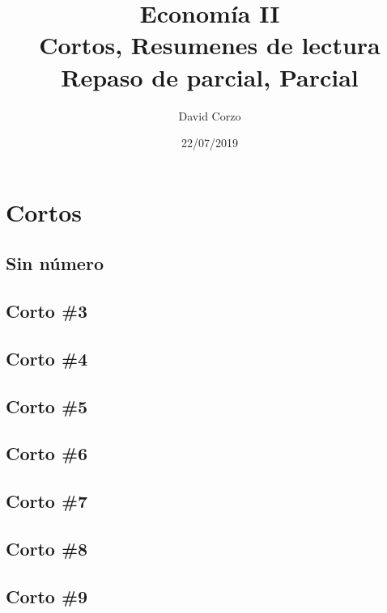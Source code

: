 \documentclass{book}
\author{David Corzo}
\date{22/07/2019}
\title{\Huge Economía II \normalsize \\ Cortos, Resumenes de lectura \\ Repaso de parcial, Parcial }
\begin{document}
\maketitle
\tableofcontents

\part{Cortos}

\chapter{Sin número}


\chapter{Corto \#3}


\chapter{Corto \#4}


\chapter{Corto \#5}


\chapter{Corto \#6}


\chapter{Corto \#7}


\chapter{Corto \#8}


\chapter{Corto \#9}

\end{document}
